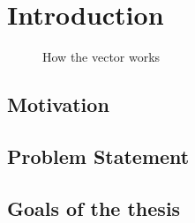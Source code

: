 \chapter{Introduction}
\label{sec:introduction}

\begin{figure}[ht]
  \begin{center}
    
    \caption{How the vector works}
  \end{center}
\end{figure}

\section{Motivation}
\label{sec:introduction:motivation}


\section{Problem Statement}
\label{sec:introduction:problemStatement}


\section{Goals of the thesis}
\label{sec:introduction:goals}
